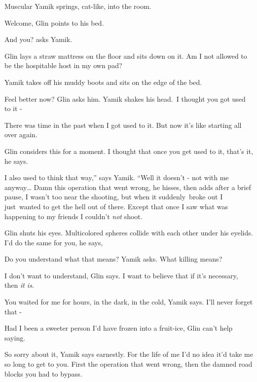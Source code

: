 \documentclass[twoside,11pt]{book}
\begin{document}
Muscular Yamik springs, cat-like, into the room. 

{\textquotedbl}Welcome,{\textquotedbl} Glin points to his bed. 

{\textquotedbl}And you?{\textquotedbl} asks Yamik.~ 

Glin lays a straw mattress on the floor and sits down on it. {\textquotedbl}Am I not allowed to be the hospitable host
in my own pad?{\textquotedbl}

Yamik takes off his muddy boots and sits on the edge of the bed. 

{\textquotedbl}Feel better now?{\textquotedbl} Glin asks him. Yamik shakes his
head.{\ }{\textquotedbl}I thought you got used to it -{\textquotedbl} 

{\textquotedbl}There was time in the past when I got used to it. But now it's like starting all over
again.{\textquotedbl} 

Glin considers this for a moment. {\textquotedbl}I thought that once you get used to it, that's it,{\textquotedbl} he
says.

{\textquotedbl}I also used to think that way,'' says Yamik. ``Well it doesn't - not with me anyway{\dots} Damn this
operation that went wrong,{\textquotedbl} he hisses, then adds after a brief pause,{\textquotedbl} I wasn't too near
the shooting, but when it suddenly{\ }broke out I
just{\ }wanted to get the hell out of there. Except that once I saw what was
happening to my friends I couldn't \textit{not} shoot.{\textquotedbl} 

Glin shuts his eyes. Multicolored spheres collide with each other under his eyelids. {\textquotedbl}I'd do the same for
you,{\textquotedbl} he says,

{\textquotedbl}Do you understand what that means?{\textquotedbl} Yamik asks. {\textquotedbl}What killing
means?{\textquotedbl} 

{\textquotedbl}I don't want to understand,{\textquotedbl} Glin says. {\textquotedbl}I want to believe that if it's
necessary, then \textit{it is}.{\textquotedbl}

{\textquotedbl}You waited for me for hours, in the dark, in the cold,{\textquotedbl} Yamik says. {\textquotedbl}I'll
never forget that -{\textquotedbl} 

{\textquotedbl}Had I been a sweeter person I'd have frozen into a fruit-ice,{\textquotedbl} Glin can't help saying.

{\textquotedbl}So sorry about it,{\textquotedbl} Yamik says earnestly. {\textquotedbl}For the life of me I'd no idea
it'd take me so long to get to you. First the operation that went wrong, then the damned road blocks you had to
bypass.{\textquotedbl}
\end{document}
